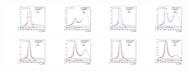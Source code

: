 \begin{figure}[htbp]
  \centering
  \includegraphics[width=0.21\textwidth]{fig/uncertainties/systs_res_e_HP_bb_LDy_scaleWY_ProjY.pdf}
  \includegraphics[width=0.21\textwidth]{fig/uncertainties/systs_res_e_LP_bb_LDy_scaleWY_ProjY.pdf}
  \includegraphics[width=0.21\textwidth]{fig/uncertainties/systs_res_e_HP_bb_HDy_scaleWY_ProjY.pdf}
  \includegraphics[width=0.21\textwidth]{fig/uncertainties/systs_res_e_LP_bb_HDy_scaleWY_ProjY.pdf}\\
  \includegraphics[width=0.21\textwidth]{fig/uncertainties/systs_res_e_HP_nobb_LDy_scaleWY_ProjY.pdf}
  \includegraphics[width=0.21\textwidth]{fig/uncertainties/systs_res_e_LP_nobb_LDy_scaleWY_ProjY.pdf}
  \includegraphics[width=0.21\textwidth]{fig/uncertainties/systs_res_e_HP_nobb_HDy_scaleWY_ProjY.pdf}
  \includegraphics[width=0.21\textwidth]{fig/uncertainties/systs_res_e_LP_nobb_HDy_scaleWY_ProjY.pdf}\\

\end{figure}
